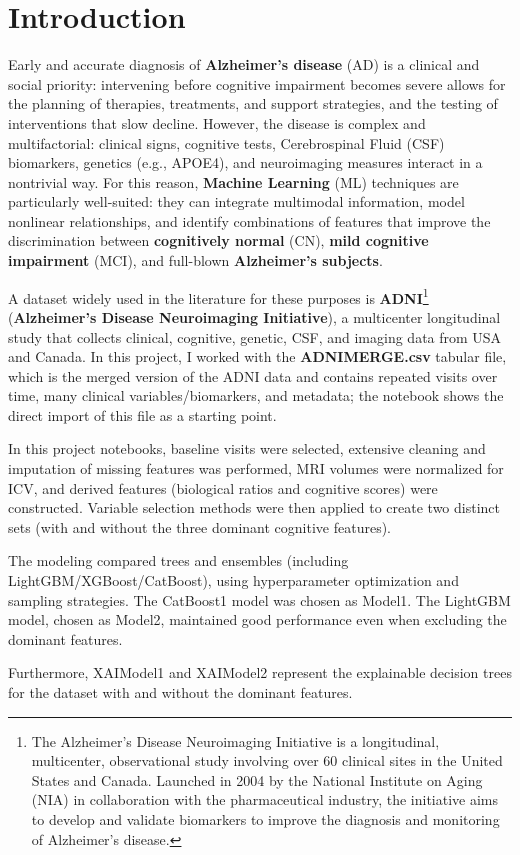 \section{Introduction}
Early and accurate diagnosis of \textbf{Alzheimer's disease} (AD) is a clinical and social priority: intervening before cognitive impairment becomes severe allows for the planning of therapies, treatments, and support strategies, and the testing of interventions that slow decline. However, the disease is complex and multifactorial: clinical signs, cognitive tests, Cerebrospinal Fluid (CSF) biomarkers, genetics (e.g., APOE4), and neuroimaging measures interact in a nontrivial way. For this reason, \textbf{Machine Learning} (ML) techniques are particularly well-suited: they can integrate multimodal information, model nonlinear relationships, and identify combinations of features that improve the discrimination between \textbf{cognitively normal} (CN), \textbf{mild cognitive impairment} (MCI), and full-blown \textbf{Alzheimer's subjects}.

A dataset widely used in the literature for these purposes is \textbf{ADNI}\footnote{The Alzheimer's Disease Neuroimaging Initiative is a longitudinal, multicenter, observational study involving over 60 clinical sites in the United States and Canada. Launched in 2004 by the National Institute on Aging (NIA) in collaboration with the pharmaceutical industry, the initiative aims to develop and validate biomarkers to improve the diagnosis and monitoring of Alzheimer's disease.} (\textbf{Alzheimer's Disease Neuroimaging Initiative}), a multicenter longitudinal study that collects clinical, cognitive, genetic, CSF, and imaging data from USA and Canada. In this project, I worked with the \textbf{ADNIMERGE.csv} tabular file, which is the merged version of the ADNI data and contains repeated visits over time, many clinical variables/biomarkers, and metadata; the notebook shows the direct import of this file as a starting point. 

In this project notebooks, baseline visits were selected, extensive cleaning and imputation of missing features was performed, MRI volumes were normalized for ICV, and derived features (biological ratios and cognitive scores) were constructed. Variable selection methods were then applied to create two distinct sets (with and without the three dominant cognitive features).

The modeling compared trees and ensembles (including LightGBM/XGBoost/CatBoost), using hyperparameter optimization and sampling strategies. The CatBoost1 model was chosen as Model1. The LightGBM model, chosen as Model2, maintained good performance even when excluding the dominant features. 

\newpage

Furthermore, XAIModel1 and XAIModel2 represent the explainable decision trees for the dataset with and without the dominant features.




